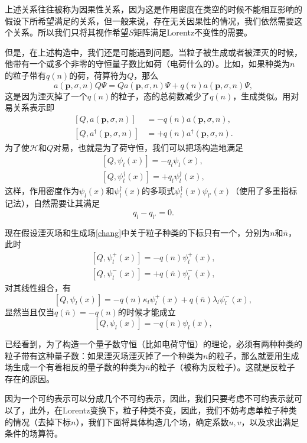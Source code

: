 \documentclass[10pt]{extbook}
\theoremstyle{plain}%
\begin{document}
上述关系往往被称为因果性关系，因为这是作用密度在类空的时候不能相互影响的假设下所希望满足的关系，但一般来说，存在无关因果性的情况，我们依然需要这个关系。所以我们只将其视作希望$S$矩阵满足Lorentz不变性的需要。

但是，在上述构造中，我们还是可能遇到问题。当粒子被生成或者被湮灭的时候，他带有一个或多个非零的守恒量子数比如荷（电荷什么的）。比如，如果种类为$n$的粒子带有$q(n)$的荷，荷算符为$Q$，那么
\[
	a(\mathbf{p},\sigma,n)Q\Psi=Qa(\mathbf{p},\sigma,n)\Psi+q(n)a(\mathbf{p},\sigma,n)\Psi,
\]
这是因为湮灭掉了一个$q(n)$的粒子，态的总荷数减少了$q(n)$，生成类似。用对易关系表示即
\[
\begin{split}
	[Q,a(\mathbf{p},\sigma,n)]&=-q(n)a(\mathbf{p},\sigma,n),\\
	[Q,a^\dag(\mathbf{p},\sigma,n)]&=+q(n)a^\dag(\mathbf{p},\sigma,n).
\end{split}
\]
为了使$\mathscr{H}$和$Q$对易，也就是为了荷守恒，我们可以把场构造地满足
\[
\begin{split}
	[Q,\psi_l(x)]=-q_l\psi_l(x),\\
	[Q,\psi^\dag_l(x)]=+q_l\psi^\dag_l(x),
\end{split}
\]
这样，作用密度作为$\psi_l(x)$和$\psi^\dag_l(x)$的多项式$\psi^\dag_l(x)\psi_{l'}(x)$（使用了多重指标记法），自然需要让其满足
\[
	q_{l}-q_{l'}=0.
\]

现在假设湮灭场和生成场\eqref{chang}中关于粒子种类的下标只有一个，分别为$n$和$\bar{n}$，此时
\[
\begin{split}
	[Q,\psi^+_l(x)]=-q(n)\psi^+_l(x),\\
	[Q,\psi^-_l(x)]=+q(\bar{n})\psi^-_l(x),
\end{split}
\]
对其线性组合，有
\[
	[Q,\psi_l(x)]=-q(n)\kappa_l\psi_l^+(x)+q(\bar{n})\lambda_l\psi_l^-(x),
\]
显然当且仅当$q(\bar{n})=-q(n)$的时候才能成立
\[
	[Q,\psi_l(x)]=-q(n)\psi_l(x),
\]


已经看到，为了构造一个量子数守恒（比如电荷守恒）的理论，必须有两种种类的粒子带有这种量子数：如果湮灭场湮灭掉了一个种类为$n$的粒子，那么就要用生成场生成一个有着相反的量子数的种类为$\bar{n}$的粒子（被称为反粒子）。这就是反粒子存在的原因。

因为一个可约表示可以分成几个不可约表示，因此，我们只要考虑不可约表示就可以了，此外，在Lorentz变换下，粒子种类不变，因此，我们不妨考虑单粒子种类的情况（去掉下标$n$），我们下面将具体构造几个场，确定系数$u,v$，以及求出满足条件的场算符。
\end{document}

